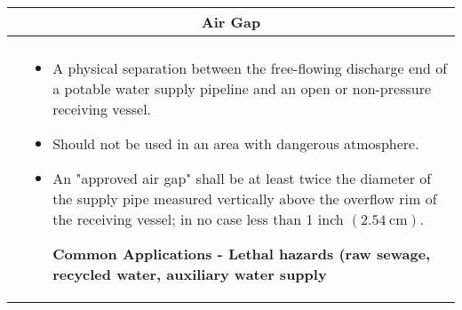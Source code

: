 \newpage
\thispagestyle{empty}
\begin{landscape}
\begin{table}[h!]
  \begin{tabular}{|c m{20cm} |}
    \hline
\multicolumn{2}{c}{Air Gap} \index{Backflow!Prevention devices!Air gap}\\ \hline
    \begin{minipage}{.3\textwidth}
    \hspace{1cm}
     \texttt{[image: AirGap]}\\
    \end{minipage}
     &
    \vspace{0.3cm}
\scriptsize{\begin{itemize}[topsep=5pt, partopsep=0pt]
\item A physical separation between the free-flowing discharge end of a potable water supply pipeline and an open or non-pressure receiving vessel. 
\item Should not be used in an area with dangerous atmosphere.
\item An "approved air gap" shall be at least twice the diameter of the supply pipe measured vertically above the overflow rim of the receiving vessel; in no case less than 1 inch $(2.54 \mathrm{~cm})$.

\textbf{Common Applications - Lethal hazards (raw sewage, recycled water, auxiliary water supply}
\end{itemize}}
\\ \hline


\end{tabular}
\end{table}
\end{landscape}
